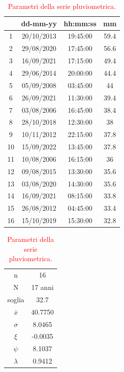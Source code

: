 \begin{table}[H]
    \begin{minipage}{.5\linewidth}
      \caption{\textcolor{red}{Campione della serie pluviometrica.}}
      \centering
        \begin{tabular}{cccc}
            \toprule
            & dd-mm-yy   & hh:mm:ss & mm \\
         \midrule
         1  & 20/10/2013 & 19:45:00 & 59.4 \\
         2  & 29/08/2020 & 17:45:00 & 56.6 \\
         3  & 16/09/2021 & 17:15:00 & 49.4 \\
         4  & 29/06/2014 & 20:00:00 & 44.4 \\
         5  & 05/09/2008 & 03:45:00 & 44   \\
         6  & 26/09/2021 & 11:30:00 & 39.4 \\
         7  & 03/08/2006 & 16:45:00 & 38.4 \\
         8  & 28/10/2018 & 12:30:00 & 38   \\
         9  & 10/11/2012 & 22:15:00 & 37.8 \\
         10 & 15/09/2022 & 13:45:00 & 37.8 \\
         11 & 10/08/2006 & 16:15:00 & 36   \\
         12 & 09/08/2015 & 13:30:00 & 35.6 \\
         13 & 03/08/2020 & 14:30:00 & 35.6 \\
         14 & 16/09/2021 & 08:15:00 & 33.8 \\
         15 & 26/08/2012 & 04:45:00 & 33.4 \\
         16 & 15/10/2019 & 15:30:00 & 32.8 \\
         \bottomrule
        \end{tabular}
    \end{minipage}%
    \begin{minipage}{.5\linewidth}
      \centering
        \caption{\textcolor{red}{Parametri della serie pluviometrica.}}
        \begin{tabular}{cc}
            \toprule
            n        &    16     \\
            N        & 17 anni \\
            soglia   &      32.7   \\
            $\bar{x}$ &    40.7750    \\
            $\sigma$ &     8.0465    \\
            $\xi$      &   -0.0035    \\
            $\psi$      &   8.1037  \\
            $\lambda$   &   0.9412 \\
        \bottomrule     
        \end{tabular}
    \end{minipage} 
\end{table}

